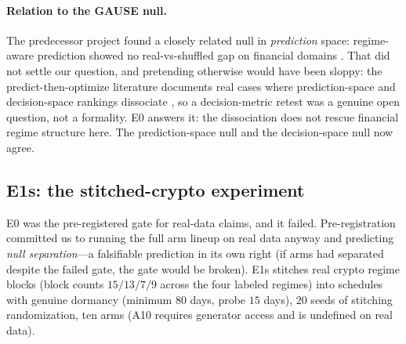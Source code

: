 \documentclass[11pt,a4paper]{article}
\theoremstyle{definition}
\theoremstyle{plain}
\begin{document}
\paragraph{Relation to the GAUSE null.} The predecessor project found a
closely related null in \emph{prediction} space: regime-aware prediction
showed no real-vs-shuffled gap on financial domains \citep{li2026gause}.
That did not settle our question, and pretending otherwise would have been
sloppy: the predict-then-optimize literature documents real cases where
prediction-space and decision-space rankings dissociate
\citep{elmachtoub2022smart,yan2026invpnco}, so a decision-metric retest was
a genuine open question, not a formality. E0 answers it: the dissociation
does not rescue financial regime structure here. The prediction-space null
and the decision-space null now agree.

\subsection{E1s: the stitched-crypto experiment}
\label{sec:dd5-e1s}

E0 was the pre-registered gate for real-data claims, and it failed.
Pre-registration committed us to running the full arm lineup on real data
anyway and predicting \emph{null separation}---a falsifiable prediction in
its own right (if arms had separated despite the failed gate, the gate
would be broken). E1s stitches real crypto regime blocks (block counts
$15/13/7/9$ across the four labeled regimes) into schedules with genuine
dormancy (minimum $80$ days, probe $15$ days), $20$ seeds of stitching
randomization, ten arms (A10 requires generator access and is undefined on
real data).
\end{document}
